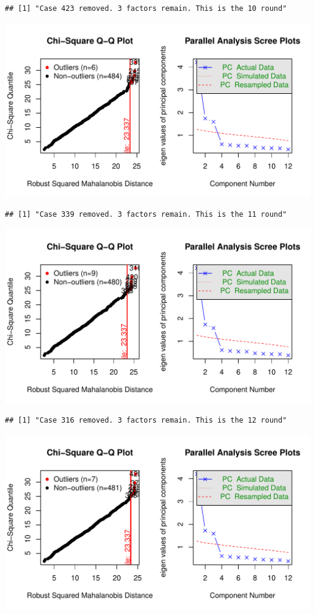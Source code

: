 \documentclass{article}\usepackage[]{graphicx}\usepackage[]{color}
\makeatletter
\def\maxwidth{ %
  \ifdim\Gin@nat@width>\linewidth
    \linewidth
  \else
    \Gin@nat@width
  \fi
}
\newenvironment{kframe}{%
 \def\at@end@of@kframe{}%
 \ifinner\ifhmode%
  \def\at@end@of@kframe{\end{minipage}}%
  \begin{minipage}{\columnwidth}%
 \fi\fi%
 \def\FrameCommand##1{\hskip\@totalleftmargin \hskip-\fboxsep
 \colorbox{shadecolor}{##1}\hskip-\fboxsep
     \hskip-\linewidth \hskip-\@totalleftmargin \hskip\columnwidth}%
 \MakeFramed {\advance\hsize-\width
   \@totalleftmargin\z@ \linewidth\hsize
   \@setminipage}}%
 {\par\unskip\endMakeFramed%
 \at@end@of@kframe}
\newenvironment{knitrout}{}{} %
\makeatother
\begin{document}
\begin{knitrout}
\begin{kframe}\begin{verbatim}
## [1] "Case 423 removed. 3 factors remain. This is the 10 round"
\end{verbatim}
\end{kframe}
\includegraphics[width=\maxwidth]{figure/unnamed-chunk-10-11} 
\begin{kframe}\begin{verbatim}
## [1] "Case 339 removed. 3 factors remain. This is the 11 round"
\end{verbatim}
\end{kframe}
\includegraphics[width=\maxwidth]{figure/unnamed-chunk-10-12} 
\begin{kframe}\begin{verbatim}
## [1] "Case 316 removed. 3 factors remain. This is the 12 round"
\end{verbatim}
\end{kframe}
\includegraphics[width=\maxwidth]{figure/unnamed-chunk-10-13} 

\end{knitrout}
\end{document}
